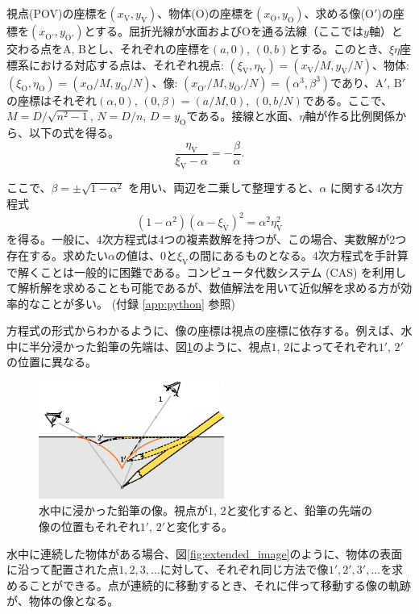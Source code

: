 \documentclass[twocolumn]{article}
\begin{document}
視点(POV)の座標を$(x_{\mathrm{V}}^{}, y_{\mathrm{V}}^{})$、物体($\mathrm{O}$)の座標を$(x_{\mathrm{O}}^{}, y_{\mathrm{O}}^{})$、求める像($\mathrm{O'}$)の座標を$(x_{\mathrm{O'}}^{}, y_{\mathrm{O'}}^{})$とする。屈折光線が水面および$\mathrm{O}$を通る法線（ここでは$y$軸）と交わる点をA, Bとし、それぞれの座標を$(a, 0)$, $(0, b)$とする。このとき、$\xi\eta$座標系における対応する点は、それぞれ視点: $(\xi_{\mathrm{V}}^{}, \eta_{\mathrm{V}}^{})=(x_{\mathrm{V}}^{}/M, y_{\mathrm{V}}^{}/N)$、物体: $(\xi_{\mathrm{O}}^{}, \eta_{\mathrm{O}}^{})=(x_{\mathrm{O}}^{}/M, y_{\mathrm{O}}^{}/N)$、像: $(x_{\mathrm{O'}}^{}/M, y_{\mathrm{O'}}^{}/N)=(\alpha^3, \beta^3)$であり、$\mathrm{A'}$, $\mathrm{B'}$の座標はそれぞれ$(\alpha, 0)$, $(0, \beta)=(a/M, 0)$, $(0, b/N)$である。ここで、$M=D/\sqrt{n^2-1}$, $N=D/n$, $D=y_{\mathrm{O}}^{}$である。接線と水面、$\eta$軸が作る比例関係から、以下の式を得る。
$$\dfrac{\eta_{\mathrm{V}}^{}}{\xi_{\mathrm{V}}^{}-\alpha}=-\dfrac{\beta}{\alpha}.$$

ここで、$\beta = \pm \sqrt{1-\alpha^2}$ を用い、両辺を二乗して整理すると、$\alpha$ に関する4次方程式
\[
\left( 1 - \alpha^2 \right) \left(\alpha-\xi_{\mathrm{V}} \right)^2 = \alpha^2 \eta_{\mathrm{V}}^2
\]
を得る。一般に、4次方程式は4つの複素数解を持つが、この場合、実数解が2つ存在する。求めたい$\alpha$の値は、0と$\xi_{\mathrm{V}}$の間にあるものとなる。4次方程式を手計算で解くことは一般的に困難である。コンピュータ代数システム (CAS) を利用して解析解を求めることも可能であるが、数値解法を用いて近似解を求める方が効率的なことが多い。 (付録 \ref{app:python} 参照)

方程式の形式からわかるように、像の座標は視点の座標に依存する。例えば、水中に半分浸かった鉛筆の先端は、図\ref{fig:pencil_view}のように、視点$1$, $2$によってそれぞれ$1'$, $2'$の位置に異なる。
	
\begin{figure}[h]
	\centering
	\includegraphics[width=2.4in]{figs/g43.eps}
	\caption{水中に浸かった鉛筆の像。視点が$1$, $2$と変化すると、鉛筆の先端の像の位置もそれぞれ$1'$, $2'$と変化する。}
	\label{fig:pencil_view}
\end{figure}

水中に連続した物体がある場合、図\ref{fig:extended_image}のように、物体の表面に沿って配置された点$1, 2, 3, ...$に対して、それぞれ同じ方法で像$1', 2', 3', ...$を求めることができる。点が連続的に移動するとき、それに伴って移動する像の軌跡が、物体の像となる。
\end{document}
